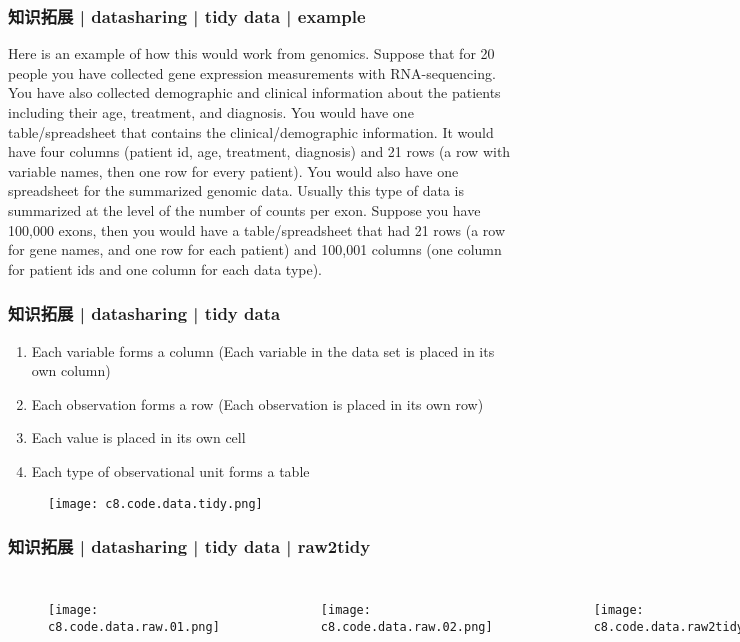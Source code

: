 \begin{frame}
  \frametitle{知识拓展 | datasharing | tidy data | example}
  Here is an example of how this would work from genomics. Suppose that for 20 people you have collected gene expression measurements with RNA-sequencing. You have also collected demographic and clinical information about the patients including their age, treatment, and diagnosis. You would have one table/spreadsheet that contains the clinical/demographic information. It would have four columns (patient id, age, treatment, diagnosis) and 21 rows (a row with variable names, then one row for every patient). You would also have one spreadsheet for the summarized genomic data. Usually this type of data is summarized at the level of the number of counts per exon. Suppose you have 100,000 exons, then you would have a table/spreadsheet that had 21 rows (a row for gene names, and one row for each patient) and 100,001 columns (one column for patient ids and one column for each data type). 
\end{frame}

\begin{frame}
  \frametitle{知识拓展 | datasharing | tidy data}
  \begin{enumerate}
    \item Each variable forms a column (Each variable in the data set is placed in its own column)
    \item Each observation forms a row (Each observation is placed in its own row)
    \item Each value is placed in its own cell
    \item Each type of observational unit forms a table
  \end{enumerate}
  \begin{figure}
    \centering
    \texttt{[image: c8.code.data.tidy.png]}
  \end{figure}
\end{frame}

\begin{frame}
  \frametitle{知识拓展 | datasharing | tidy data | raw2tidy}
  \begin{columns}
  \begin{figure}
    \centering
    \texttt{[image: c8.code.data.raw.01.png]}
  \end{figure}
  \begin{figure}
    \centering
    \texttt{[image: c8.code.data.raw.02.png]}
  \end{figure}
  \begin{figure}
    \centering
    \texttt{[image: c8.code.data.raw2tidy.png]}
  \end{figure}
\end{columns}
\end{frame}

